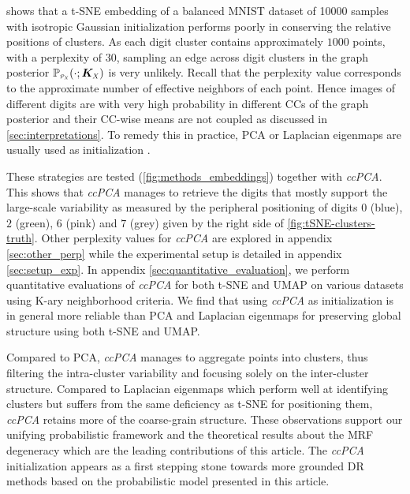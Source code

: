  shows that a t-SNE embedding of a balanced MNIST dataset of 10000 samples \cite{deng2012mnist} with isotropic Gaussian initialization performs poorly in conserving the relative positions of clusters. As each digit cluster contains approximately $1000$ points, with a perplexity of $30$, sampling an edge across digit clusters in the graph posterior $\mathbb{P}_{\scaleto{\mathcal{P}_X}{4pt}}(\cdot;\bm{K}_{\scaleto{X}{4pt}})$ is very unlikely. Recall that the perplexity value \cite{maaten2008tSNE} corresponds to the approximate number of effective neighbors of each point. Hence images of different digits are with very high probability in different CCs of the graph posterior and their CC-wise means are not coupled as discussed in \cref{sec:interpretations}. To remedy this in practice, PCA or Laplacian eigenmaps are usually used as initialization \cite{kobak2021initialization}. 

These strategies are tested (\cref{fig:methods_embeddings}) together with \textit{ccPCA}. This shows that 
\textit{ccPCA} manages to retrieve the digits that mostly support the large-scale variability as measured by the peripheral positioning of digits $0$ (blue), $2$ (green), $6$ (pink) and $7$ (grey) given by the right side of \cref{fig:tSNE-clusters-truth}. Other perplexity values for \textit{ccPCA} are explored in appendix \ref{sec:other_perp} while the experimental setup is detailed in appendix \ref{sec:setup_exp}. In appendix \ref{sec:quantitative_evaluation}, we perform quantitative evaluations of \textit{ccPCA} for both t-SNE and UMAP on various datasets using K-ary neighborhood criteria. We find that using \textit{ccPCA} as initialization is in general more reliable than PCA and Laplacian eigenmaps for preserving global structure using both t-SNE and UMAP. 

Compared to PCA, \textit{ccPCA} manages to aggregate points into clusters, thus filtering the intra-cluster variability and focusing solely on the inter-cluster structure. Compared to Laplacian eigenmaps which perform well at identifying clusters but suffers from the same deficiency as t-SNE for positioning them, \textit{ccPCA} retains more of the coarse-grain structure. These observations support our unifying probabilistic framework and the theoretical results about the MRF degeneracy which are the leading contributions of this article. The \textit{ccPCA} initialization appears as a first stepping stone towards more grounded DR methods based on the probabilistic model presented in this article.

